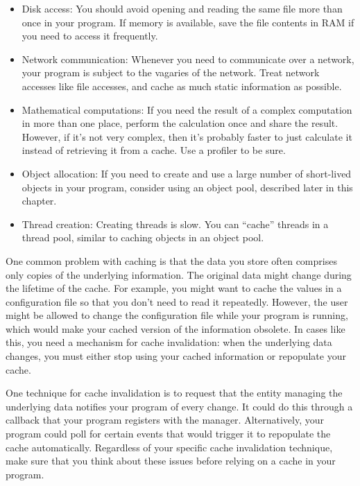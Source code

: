 \begin{itemize}
\item
Disk access: You should avoid opening and reading the same file more than once in your program. If memory is available, save the file contents in RAM if you need to access it frequently.

\item
Network communication: Whenever you need to communicate over a network, your program is subject to the vagaries of the network. Treat network accesses like file accesses, and cache as much static information as possible.

\item
Mathematical computations: If you need the result of a complex computation in more than one place, perform the calculation once and share the result. However, if it’s not very complex, then it’s probably faster to just calculate it instead of retrieving it from a cache. Use a profiler to be sure.

\item
Object allocation: If you need to create and use a large number of short-lived objects in your program, consider using an object pool, described later in this chapter.

\item
Thread creation: Creating threads is slow. You can “cache” threads in a thread pool, similar to caching objects in an object pool.
\end{itemize}

One common problem with caching is that the data you store often comprises only copies of the underlying information. The original data might change during the lifetime of the cache. For example, you might want to cache the values in a configuration file so that you don’t need to read it repeatedly. However, the user might be allowed to change the configuration file while your program is running, which would make your cached version of the information obsolete. In cases like this, you need a mechanism for cache invalidation: when the underlying data changes, you must either stop using your cached information or repopulate your cache.

One technique for cache invalidation is to request that the entity managing the underlying data notifies your program of every change. It could do this through a callback that your program registers with the manager. Alternatively, your program could poll for certain events that would trigger it to repopulate the cache automatically. Regardless of your specific cache invalidation technique, make sure that you think about these issues before relying on a cache in your program.

